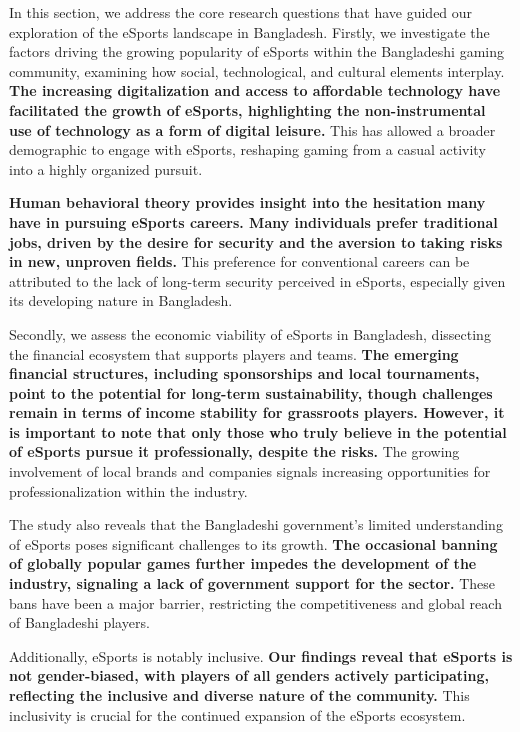 \documentclass[manuscript,screen,review,anonymous]{acmart}
\begin{document}
In this section, we address the core research questions that have guided our exploration of the eSports landscape in Bangladesh. Firstly, we investigate the factors driving the growing popularity of eSports within the Bangladeshi gaming community, examining how social, technological, and cultural elements interplay. \textbf{The increasing digitalization and access to affordable technology have facilitated the growth of eSports, highlighting the non-instrumental use of technology as a form of digital leisure.} This has allowed a broader demographic to engage with eSports, reshaping gaming from a casual activity into a highly organized pursuit.

\textbf{Human behavioral theory provides insight into the hesitation many have in pursuing eSports careers. Many individuals prefer traditional jobs, driven by the desire for security and the aversion to taking risks in new, unproven fields.} This preference for conventional careers can be attributed to the lack of long-term security perceived in eSports, especially given its developing nature in Bangladesh.

Secondly, we assess the economic viability of eSports in Bangladesh, dissecting the financial ecosystem that supports players and teams. \textbf{The emerging financial structures, including sponsorships and local tournaments, point to the potential for long-term sustainability, though challenges remain in terms of income stability for grassroots players. However, it is important to note that only those who truly believe in the potential of eSports pursue it professionally, despite the risks.} The growing involvement of local brands and companies signals increasing opportunities for professionalization within the industry.

The study also reveals that the Bangladeshi government’s limited understanding of eSports poses significant challenges to its growth. \textbf{The occasional banning of globally popular games further impedes the development of the industry, signaling a lack of government support for the sector.} These bans have been a major barrier, restricting the competitiveness and global reach of Bangladeshi players.

Additionally, eSports is notably inclusive. \textbf{Our findings reveal that eSports is not gender-biased, with players of all genders actively participating, reflecting the inclusive and diverse nature of the community.} This inclusivity is crucial for the continued expansion of the eSports ecosystem.
\end{document}
